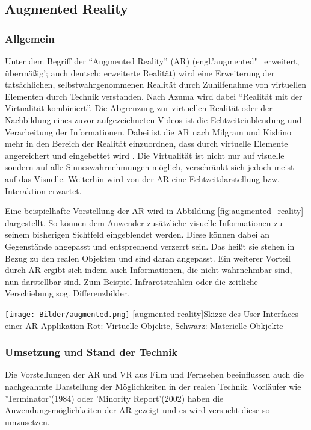 \documentclass[12pt,a4paper,bibliography=totocnumbered,listof=totocnumbered]{scrartcl}
\begin{document}
\subsection{Augmented Reality}
\subsubsection{Allgemein}
Unter dem Begriff der “Augmented Reality” (\ac{AR}) (engl.'augmented"~ erweitert, übermäßig'; auch deutsch: erweiterte Realität) wird eine Erweiterung der tatsächlichen, selbstwahrgenommenen Realität durch Zuhilfenahme von virtuellen Elementen durch Technik verstanden. Nach Azuma wird dabei “Realität mit der Virtualität kombiniert”. Die Abgrenzung zur virtuellen Realität oder der Nachbildung eines zuvor aufgezeichneten Videos ist die Echtzeiteinblendung und Verarbeitung der Informationen. Dabei ist die AR nach Milgram und Kishino mehr in den Bereich der Realität einzuordnen, dass durch virtuelle Elemente angereichert und eingebettet wird \cite{Tonnis:2010aa}. Die Virtualität ist nicht nur auf visuelle sondern auf alle Sinneswahrnehmungen möglich, verschränkt sich jedoch meist auf das Visuelle. Weiterhin wird von der AR eine Echtzeitdarstellung bzw. Interaktion erwartet. 

	Eine beispielhafte Vorstellung der AR wird in Abbildung \ref{fig:augmented_reality} dargestellt. So können dem Anwender zusätzliche visuelle Informationen zu seinem bisherigen Sichtfeld eingeblendet werden. Diese können dabei an Gegenstände angepasst und entsprechend verzerrt sein. Das heißt sie stehen in Bezug zu den realen Objekten und sind daran angepasst. 
	Ein weiterer Vorteil durch AR ergibt sich indem auch Informationen, die nicht wahrnehmbar sind, nun darstellbar sind. Zum Beispiel Infrarotstrahlen oder die zeitliche Verschiebung sog. Differenzbilder.
	

\begin{minipage}{\linewidth}
\vspace{1em}
	\centering
	\texttt{[image: Bilder/augmented.png]}
	[augmented-reality]{Skizze des User Interfaces einer AR Applikation\newline
	Rot: Virtuelle Objekte, Schwarz: Materielle Obkjekte}
	\label{fig:augmented_reality}
\vspace{1em}
\end{minipage}

\subsubsection{Umsetzung und Stand der Technik}
Die Vorstellungen der AR und VR aus Film und Fernsehen beeinflussen auch die nachgeahmte Darstellung der Möglichkeiten in der realen Technik. Vorläufer wie 'Terminator'(1984) oder 'Minority Report'(2002) haben die Anwendungsmöglichkeiten der AR gezeigt und es wird versucht diese so umzusetzen.
\end{document}

